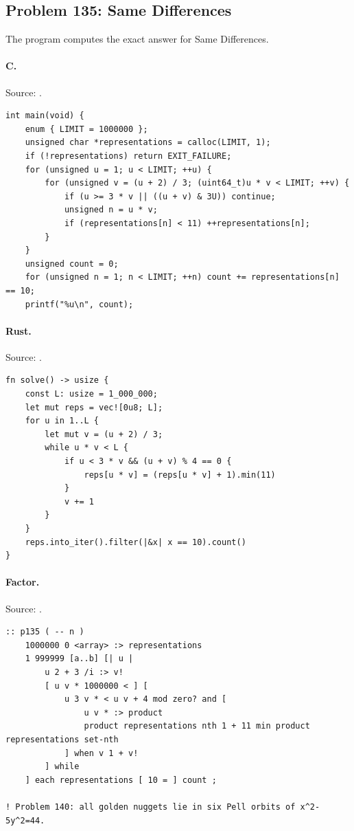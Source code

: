 \subsection{Problem 135: Same Differences}
\label{walkthrough:p135}
The program computes the exact answer for Same Differences.

\paragraph{C.} Source: .
\begin{lstlisting}
int main(void) {
    enum { LIMIT = 1000000 };
    unsigned char *representations = calloc(LIMIT, 1);
    if (!representations) return EXIT_FAILURE;
    for (unsigned u = 1; u < LIMIT; ++u) {
        for (unsigned v = (u + 2) / 3; (uint64_t)u * v < LIMIT; ++v) {
            if (u >= 3 * v || ((u + v) & 3U)) continue;
            unsigned n = u * v;
            if (representations[n] < 11) ++representations[n];
        }
    }
    unsigned count = 0;
    for (unsigned n = 1; n < LIMIT; ++n) count += representations[n] == 10;
    printf("%u\n", count);
\end{lstlisting}

\paragraph{Rust.} Source: .
\begin{lstlisting}
fn solve() -> usize {
    const L: usize = 1_000_000;
    let mut reps = vec![0u8; L];
    for u in 1..L {
        let mut v = (u + 2) / 3;
        while u * v < L {
            if u < 3 * v && (u + v) % 4 == 0 {
                reps[u * v] = (reps[u * v] + 1).min(11)
            }
            v += 1
        }
    }
    reps.into_iter().filter(|&x| x == 10).count()
}
\end{lstlisting}

\paragraph{Factor.} Source: .
\begin{lstlisting}
:: p135 ( -- n )
    1000000 0 <array> :> representations
    1 999999 [a..b] [| u |
        u 2 + 3 /i :> v!
        [ u v * 1000000 < ] [
            u 3 v * < u v + 4 mod zero? and [
                u v * :> product
                product representations nth 1 + 11 min product representations set-nth
            ] when v 1 + v!
        ] while
    ] each representations [ 10 = ] count ;

! Problem 140: all golden nuggets lie in six Pell orbits of x^2-5y^2=44.
\end{lstlisting}

